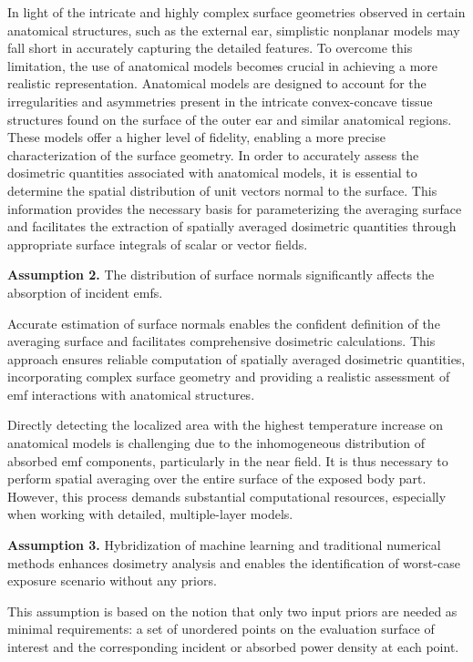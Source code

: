 In light of the intricate and highly complex surface geometries observed in certain anatomical structures, such as the external ear, simplistic nonplanar models may fall short in accurately capturing the detailed features.
To overcome this limitation, the use of anatomical models becomes crucial in achieving a more realistic representation.
Anatomical models are designed to account for the irregularities and asymmetries present in the intricate convex-concave tissue structures found on the surface of the outer ear and similar anatomical regions.
These models offer a higher level of fidelity, enabling a more precise characterization of the surface geometry.
In order to accurately assess the dosimetric quantities associated with anatomical models, it is essential to determine the spatial distribution of unit vectors normal to the surface.
This information provides the necessary basis for parameterizing the averaging surface and facilitates the extraction of spatially averaged dosimetric quantities through appropriate surface integrals of scalar or vector fields.
\begin{block}
    \textbf{Assumption 2.} The distribution of surface normals significantly affects the absorption of incident \gls{emf}s.
\end{block}
Accurate estimation of surface normals enables the confident definition of the averaging surface and facilitates comprehensive dosimetric calculations.
This approach ensures reliable computation of spatially averaged dosimetric quantities, incorporating complex surface geometry and providing a realistic assessment of \gls{emf} interactions with anatomical structures.

Directly detecting the localized area with the highest temperature increase on anatomical models is challenging due to the inhomogeneous distribution of absorbed \gls{emf} components, particularly in the near field.
It is thus necessary to perform spatial averaging over the entire surface of the exposed body part.
However, this process demands substantial computational resources, especially when working with detailed, multiple-layer models.
\begin{block}
    \textbf{Assumption 3.} Hybridization of machine learning and traditional numerical methods enhances dosimetry analysis and enables the identification of worst-case exposure scenario without any priors.
\end{block}
This assumption is based on the notion that only two input priors are needed as minimal requirements: a set of unordered points on the evaluation surface of interest and the corresponding incident or absorbed power density at each point.

